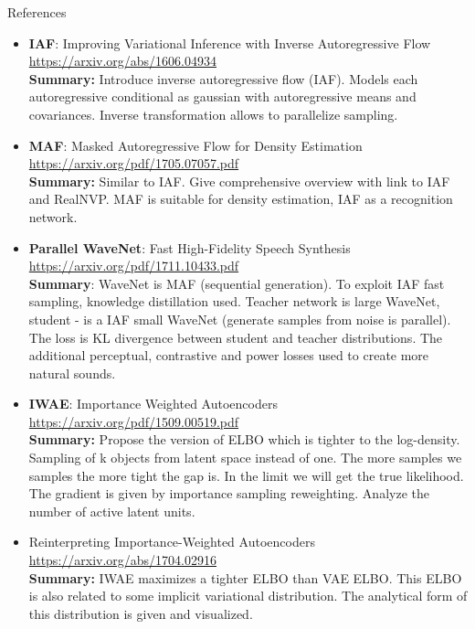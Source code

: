 \documentclass{beamer}
\begin{document}
\begin{frame}{References}
{\tiny
\begin{itemize}
	
	\item \textbf{IAF}: Improving Variational Inference with Inverse Autoregressive Flow \\
	\href{https://arxiv.org/abs/1606.04934}{https://arxiv.org/abs/1606.04934} \\
	\textbf{Summary:} Introduce inverse autoregressive flow (IAF). Models each autoregressive conditional as gaussian with autoregressive means and covariances. Inverse transformation allows to parallelize sampling.
	
	\item \textbf{MAF}: Masked Autoregressive Flow for Density Estimation \\ 
	\href{https://arxiv.org/pdf/1705.07057.pdf}{https://arxiv.org/pdf/1705.07057.pdf} \\
	\textbf{Summary:} Similar to IAF. Give comprehensive overview with link to IAF and RealNVP.  MAF is suitable for density estimation, IAF as a recognition network.
	
	\item \textbf{Parallel WaveNet}: Fast High-Fidelity Speech Synthesis \\
	\href{https://arxiv.org/pdf/1711.10433.pdf}{https://arxiv.org/pdf/1711.10433.pdf} \\
	\textbf{Summary}: WaveNet is MAF (sequential generation). To exploit IAF fast sampling, knowledge distillation used. Teacher network is large WaveNet, student - is a IAF small WaveNet (generate samples from noise is parallel). The loss is KL divergence between student and teacher distributions. The additional perceptual, contrastive and power losses used to create more natural sounds.
	
	\item \textbf{IWAE}: Importance Weighted Autoencoders \\
	\href{https://arxiv.org/pdf/1509.00519.pdf}{https://arxiv.org/pdf/1509.00519.pdf} \\
	\textbf{Summary:} Propose the version of ELBO which is tighter to the log-density. Sampling of k objects from latent space instead of one. The more samples we samples the more tight the gap is. In the limit we will get the true likelihood. The gradient is given by importance sampling reweighting. Analyze the number of active latent units.

    \item Reinterpreting Importance-Weighted Autoencoders \\
	\href{https://arxiv.org/abs/1704.02916}{https://arxiv.org/abs/1704.02916} \\
	\textbf{Summary:} IWAE maximizes a tighter ELBO than VAE ELBO. This ELBO is also related to some implicit variational distribution. The analytical form of this distribution is given and visualized. 
	

\end{itemize}}
\end{frame}
\end{document}
